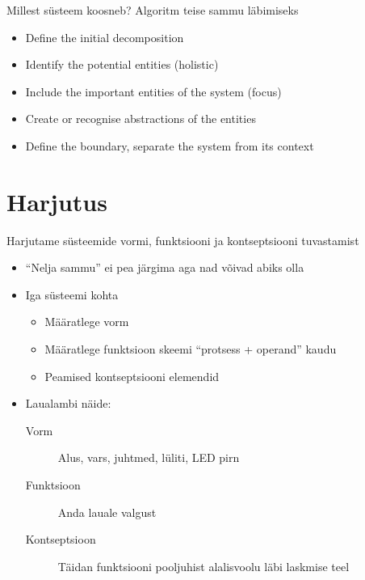 \documentclass{beamer}
\begin{document}
\begin{frame}{Millest süsteem koosneb?}
	Algoritm teise sammu läbimiseks
	
			\begin{itemize}
				\item Define the initial decomposition
				\item Identify the potential entities (holistic)
				\item Include the important entities of the system (focus)
				\item Create or recognise abstractions of the entities
				\item Define the boundary, separate the system from its context
			\end{itemize}
\cite{crawley2015system}
\end{frame}


\section{Harjutus}

\begin{frame}
	Harjutame süsteemide vormi, funktsiooni ja kontseptsiooni tuvastamist
	\begin{itemize}
		\item \enquote{Nelja sammu} ei pea järgima aga nad võivad abiks olla
		\item Iga süsteemi kohta
		\begin{itemize}
			\item Määratlege vorm
			\item Määratlege funktsioon skeemi \enquote{protsess + operand} kaudu
			\item Peamised kontseptsiooni elemendid
		\end{itemize}
		\item Laualambi näide:
		\begin{description}
			\item[Vorm] Alus, vars, juhtmed, lüliti, LED pirn
			\item[Funktsioon] Anda lauale valgust
			\item[Kontseptsioon] Täidan funktsiooni pooljuhist alalisvoolu läbi laskmise teel
		\end{description}
	\end{itemize}
\end{frame}
\end{document}
